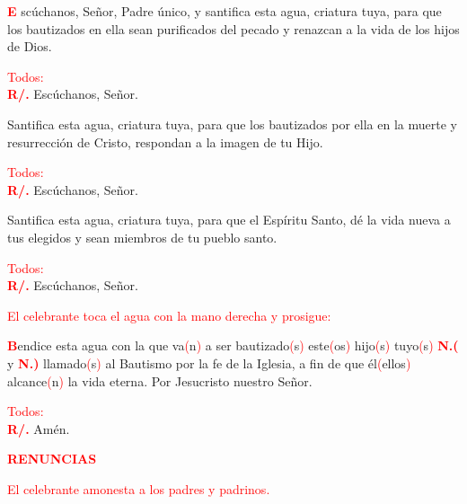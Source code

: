 \documentclass[12pt, letterpaper, spanish]{article}
\begin{document}
  \lettrine[lines=2]{\bfseries \textcolor{red}{E}}{} \Large sc\'uchanos, Se\~nor, Padre \'unico, y santifica esta agua, criatura tuya, para que los bautizados en ella sean purificados del pecado y renazcan a la vida de los hijos de Dios.

  \large {\textcolor{red}{Todos:}}\\
  \Large {\bfseries \textcolor{red}{R/.}} \hspace{0.5cm} Esc\'uchanos, Se\~nor.

  \noindent
  \Large Santifica esta agua, criatura tuya, para que los bautizados por ella en la muerte y resurrecci\'on de Cristo, respondan a la imagen de tu Hijo.

  \large {\textcolor{red}{Todos:}}\\
  \Large {\bfseries \textcolor{red}{R/.}} \hspace{0.5cm} Esc\'uchanos, Se\~nor.

  \noindent
  \Large Santifica esta agua, criatura tuya, para que el Esp\'iritu Santo, d\'e la vida nueva a tus elegidos y sean miembros de tu pueblo santo.

  \large {\textcolor{red}{Todos:}}\\
  \Large {\bfseries \textcolor{red}{R/.}} \hspace{0.5cm} Esc\'uchanos, Se\~nor.

  \large {\textcolor{red}{El celebrante toca el agua con la mano derecha y prosigue:}}
  
  \lettrine[lines=2]{\bfseries \textcolor{red}{B}}{}\Large endice \Huge{\textcolor{red}{}} \Large esta agua con la que va\textcolor{red}{(}n\textcolor{red}{)} a ser bautizado\textcolor{red}{(}s\textcolor{red}{)} este\textcolor{red}{(}os\textcolor{red}{)} hijo\textcolor{red}{(}s\textcolor{red}{)} tuyo\textcolor{red}{(}s\textcolor{red}{)} {\bfseries \textcolor{red}{N.(}} y {\bfseries \textcolor{red}{N.)}} llamado\textcolor{red}{(}s\textcolor{red}{)} al Bautismo por la fe de la Iglesia, a fin de que \'el\textcolor{red}{(}ellos\textcolor{red}{)} alcance\textcolor{red}{(}n\textcolor{red}{)} la vida eterna. Por Jesucristo nuestro Se\~nor.

  \large {\textcolor{red}{Todos:}}\\
  \Large {\bfseries \textcolor{red}{R/.}} \hspace{0.5cm} Am\'en.

  \Large {\bfseries \textcolor{red}{RENUNCIAS}}

  \large {\textcolor{red}{El celebrante amonesta a los padres y padrinos.}}
\end{document}
